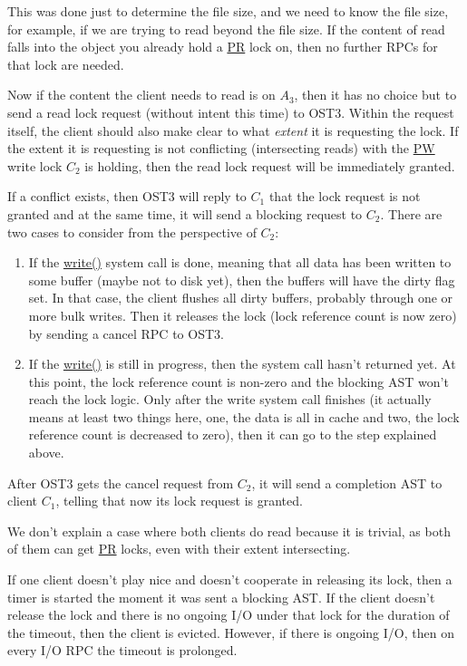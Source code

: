 This was done just to determine the file size, and we need to know the file size,
for example, if we are trying to read beyond the file size.  If the content of
read falls into the object you already hold a \url{PR} lock on, then no further
RPCs for that lock are needed.

Now if the content the client needs to read is on $A_3$, then it has no choice
but to send a read lock request (without intent this time) to OST3.  Within the
request itself, the client should also make clear to what \textit{extent} it is
requesting the lock. If the extent it is requesting is not conflicting
(intersecting reads) with the \url{PW} write lock $C_2$ is holding, then the
read lock request will be immediately granted.

If a conflict exists, then OST3 will reply to $C_1$ that the lock request is
not granted and at the same time, it will send a blocking request to $C_2$.
There are two cases to consider from the perspective of $C_2$:

\begin{enumerate}

    \item If the \url{write()} system call is done, meaning that all data has
    been written to some buffer (maybe not to disk yet), then the buffers will
    have the dirty flag set. In that case, the client flushes all dirty buffers, probably
    through one or more bulk writes. Then it releases the lock (lock
    reference count is now zero) by sending a cancel RPC to OST3.

    \item If the \url{write()} is still in progress, then the system call
    hasn't returned yet. At this point, the lock reference count is non-zero and
    the blocking AST won't reach the lock logic.
    Only after the write system call finishes (it actually means at
    least two things here, one, the data is all in cache and two, the lock
    reference count is decreased to zero), then it can go to the step explained above.

\end{enumerate}

After OST3 gets the cancel request from $C_2$, it will send a completion
AST to client $C_1$, telling that now its lock request is granted.

We don't explain a case where both clients do read because it is trivial, as  
both of them can get \url{PR} locks, even with their extent intersecting.

If one client doesn't play nice and doesn't cooperate in releasing its lock,
then a timer is started the moment it was sent a blocking AST. If the client
doesn't release the lock and there is no ongoing I/O under that lock for the
duration of the timeout, then the client is evicted. However, if there is
ongoing I/O, then on every I/O RPC the timeout is prolonged.

